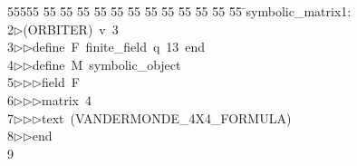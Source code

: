 %
%
\begin{tabbing}
55555 \= 55 \= 55 \= 55 \= 55 \= 55 \= 55 \= 55 \= 55 \= 55 \= 55 \= 55 \= 55 \= \>symbolic\_matrix1:\\[0pt]
2\>$\triangleright$\>(ORBITER)\ v\ 3\ \\[0pt]
3\>$\triangleright$\>$\triangleright$\>define\ F\ finite\_field\ q\ 13\ end\ \\[0pt]
4\>$\triangleright$\>$\triangleright$\>define\ M\ symbolic\_object\ \\[0pt]
5\>$\triangleright$\>$\triangleright$\>$\triangleright$\>field\ F\ \\[0pt]
6\>$\triangleright$\>$\triangleright$\>$\triangleright$\>matrix\ 4\ \\[0pt]
7\>$\triangleright$\>$\triangleright$\>$\triangleright$\>text\ (VANDERMONDE\_4X4\_FORMULA)\ \\[0pt]
8\>$\triangleright$\>$\triangleright$\>end\\[0pt]
9\>\end{tabbing}
